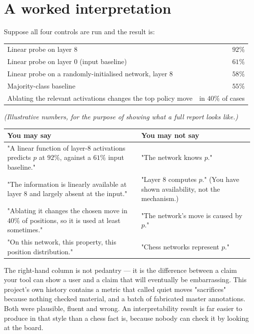 \section{A worked interpretation}

Suppose all four controls are run and the result is:

\begin{center}
\begin{tabular}{@{}lr@{}}
\toprule
Linear probe on layer 8 & $92\%$ \\
Linear probe on layer 0 (input baseline) & $61\%$ \\
Linear probe on a randomly-initialised network, layer 8 & $58\%$ \\
Majority-class baseline & $55\%$ \\
Ablating the relevant activations changes the top policy move & in $40\%$ of cases \\
\bottomrule
\end{tabular}
\end{center}
\emph{(Illustrative numbers, for the purpose of showing what a full report looks like.)}

\begin{center}
\begin{tabular}{@{}p{6.6cm}p{6.6cm}@{}}
\toprule
\textbf{You may say} & \textbf{You may not say} \\
\midrule
"A linear function of layer-8 activations predicts $p$ at $92\%$, against a $61\%$ input
baseline." & "The network knows $p$." \\
\addlinespace
"The information is linearly available at layer 8 and largely absent at the input." &
"Layer 8 computes $p$." (You have shown availability, not the mechanism.) \\
\addlinespace
"Ablating it changes the chosen move in $40\%$ of positions, so it is used at least
sometimes." & "The network's move is caused by $p$." \\
\addlinespace
"On this network, this property, this position distribution." & "Chess networks represent
$p$." \\
\bottomrule
\end{tabular}
\end{center}

\begin{pitfall}
The right-hand column is not pedantry --- it is the difference between a claim your tool can
show a user and a claim that will eventually be embarrassing. This project's own history
contains a metric that called quiet moves "sacrifices" because nothing checked material, and a
batch of fabricated master annotations. Both were plausible, fluent and wrong. An
interpretability result is far easier to produce in that style than a chess fact is, because
nobody can check it by looking at the board.
\end{pitfall}

